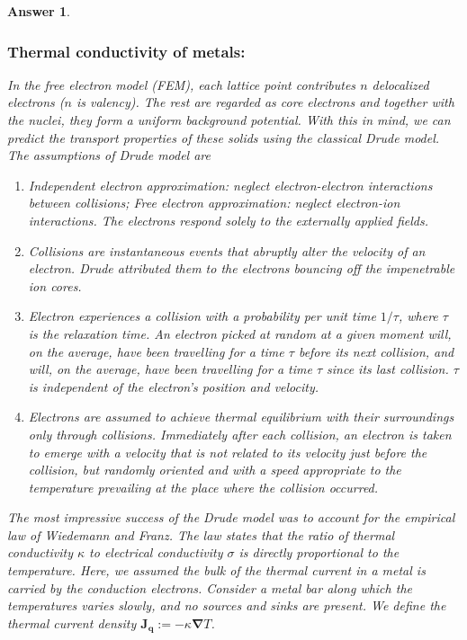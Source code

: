 \documentclass[a4paper]{article}
\newtheorem{ans}{Answer}[subsection]
\theoremstyle{new}
\begin{document}
\begin{ans}
\subsubsection*{Thermal conductivity of metals:}
In the free electron model (FEM), each lattice point contributes $n$ delocalized electrons ($n$ is valency). The rest are regarded as core electrons and together with the nuclei, they form a uniform background potential. With this in mind, we can predict the transport properties of these solids using the classical Drude model. The assumptions of Drude model are
\begin{enumerate}
    \item Independent electron approximation: neglect electron-electron interactions between collisions; Free electron approximation: neglect electron-ion interactions. The electrons respond solely to the externally applied fields.
    \item Collisions are instantaneous events that abruptly alter the velocity of an electron. Drude attributed them to the electrons bouncing off the impenetrable ion cores.
    \item Electron experiences a collision with a probability per unit time $1/\tau$, where $\tau$ is the relaxation time. An electron picked at random at a given moment will, on the average, have been travelling for a time $\tau$ before its next collision, and will, on the average, have been travelling for a time $\tau$ since its last collision. $\tau$ is independent of the electron's position and velocity.
    \item Electrons are assumed to achieve thermal equilibrium with their surroundings only through collisions. Immediately after each collision, an electron is taken to emerge with a velocity that is not related to its velocity just before the collision, but randomly oriented and with a speed appropriate to the temperature prevailing at the place where the collision occurred.
\end{enumerate}
The most impressive success of the Drude model was to account for the empirical law of Wiedemann and Franz. The law states that the ratio of thermal conductivity $\kappa$ to electrical conductivity $\sigma$ is directly proportional to the temperature. Here, we assumed the bulk of the thermal current in a metal is carried by the conduction electrons. Consider a metal bar along which the temperatures varies slowly, and no sources and sinks are present. We define the thermal current density $\mathbf{J_q}:=-\kappa\boldsymbol{\nabla}T$.\\[5pt]

\end{ans}
\end{document}
